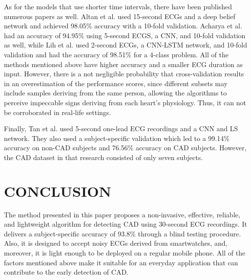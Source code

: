 As for the models that use shorter time intervals, there have been published numerous papers as well. Altan et al. \cite{altan} used 15-second ECGs and a deep belief network and achieved 98.05\% accuracy with a 10-fold validation. Acharya et al. \cite{acharya} had an accuracy of 94.95\% using 5-second ECGS, a CNN, and 10-fold validation as well, while Lih et al. \cite{lih} used 2-second ECGs, a CNN-LSTM network, and 10-fold validation and had the accuracy of 98.51\% for a 4-class problem. All of the methods mentioned above have higher accuracy and a smaller ECG duration as input. However, there is a not negligible probability that cross-validation results in an overestimation of the performance scores, since different subsets may include samples deriving from the same person, allowing the algorithms to perceive impeccable signs deriving from each heart's physiology. Thus, it can not be corroborated in real-life settings.

Finally, Tan et al. \cite{tan} used 5-second one-lead ECG recordings and a CNN and LS network. They also used a subject-specific validation which led to a 99.14\% accuracy on non-CAD subjects and 76.56\% accuracy on CAD subjects. However, the CAD dataset in that research consisted of only seven subjects.

\section{CONCLUSION}
\label{sec:conclusion}

The method presented in this paper proposes a non-invasive, effective, reliable, and lightweight algorithm for detecting CAD using 30-second ECG recordings. It delivers a subject-specific accuracy of 93.8\% through a blind testing procedure. Also, it is designed to accept noisy ECGs derived from smartwatches, and, moreover, it is light enough to be deployed on a regular mobile phone. All of the factors mentioned above make it suitable for an everyday application that can contribute to the early detection of CAD.

\vfill\pagebreak





